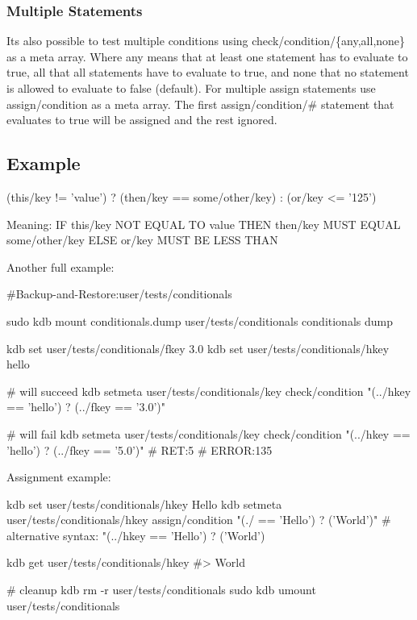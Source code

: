 \subsubsection*{Multiple Statements}

It\textquotesingle{}s also possible to test multiple conditions using {\ttfamily check/condition/\{any,all,none\}} as a meta array. Where {\ttfamily any} means that at least one statement has to evaluate to true, {\ttfamily all} that all statements have to evaluate to true, and {\ttfamily none} that no statement is allowed to evaluate to false (default). For multiple assign statements use {\ttfamily assign/condition} as a meta array. The first {\ttfamily assign/condition/\#} statement that evaluates to true will be assigned and the rest ignored.

\subsection*{Example}

\begin{DoxyVerb}(this/key  != 'value') ? (then/key == some/other/key) : (or/key <= '125')
\end{DoxyVerb}


Meaning\+: IF {\ttfamily this/key} N\+OT E\+Q\+U\+AL TO {\ttfamily \textquotesingle{}value\textquotesingle{}} T\+H\+EN {\ttfamily then/key} M\+U\+ST E\+Q\+U\+AL {\ttfamily some/other/key} E\+L\+SE {\ttfamily or/key} M\+U\+ST BE L\+E\+SS T\+H\+AN {}

Another full example\+:


\begin{DoxyCode}
#Backup-and-Restore:user/tests/conditionals

sudo kdb mount conditionals.dump user/tests/conditionals conditionals dump

kdb set user/tests/conditionals/fkey 3.0
kdb set user/tests/conditionals/hkey hello

# will succeed
kdb setmeta user/tests/conditionals/key check/condition "(../hkey == 'hello') ? (../fkey == '3.0')"

# will fail
kdb setmeta user/tests/conditionals/key check/condition "(../hkey == 'hello') ? (../fkey == '5.0')"
# RET:5
# ERROR:135
\end{DoxyCode}


Assignment example\+:


\begin{DoxyCode}
kdb set user/tests/conditionals/hkey Hello
kdb setmeta user/tests/conditionals/hkey assign/condition "(./ == 'Hello') ? ('World')"
# alternative syntax: "(../hkey == 'Hello') ? ('World')

kdb get user/tests/conditionals/hkey
#> World

# cleanup
kdb rm -r user/tests/conditionals
sudo kdb umount user/tests/conditionals
\end{DoxyCode}


